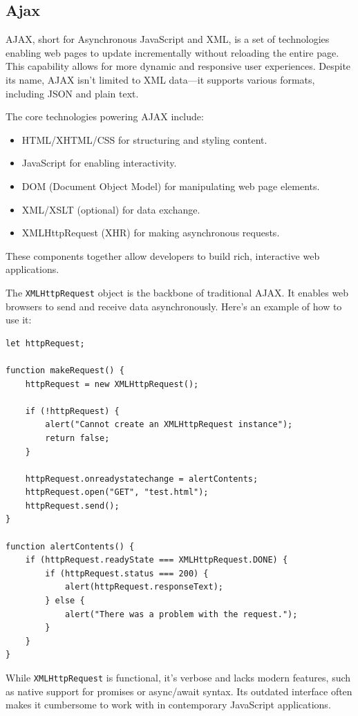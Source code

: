 \subsection*{Ajax}
AJAX, short for Asynchronous JavaScript and XML, is a set of technologies enabling web pages to update incrementally without reloading the entire page. This capability allows for more dynamic and responsive user experiences. Despite its name, AJAX isn’t limited to XML data—it supports various formats, including JSON and plain text.

The core technologies powering AJAX include:
\begin{itemize}
    \item HTML/XHTML/CSS for structuring and styling content.
    \item JavaScript for enabling interactivity.
    \item DOM (Document Object Model) for manipulating web page elements.
    \item XML/XSLT (optional) for data exchange.
    \item XMLHttpRequest (XHR) for making asynchronous requests.
\end{itemize}
These components together allow developers to build rich, interactive web applications.

The \texttt{XMLHttpRequest} object is the backbone of traditional AJAX. It enables web browsers to send and receive data asynchronously. Here’s an example of how to use it:

\begin{verbatim}
let httpRequest;

function makeRequest() {
    httpRequest = new XMLHttpRequest();

    if (!httpRequest) {
        alert("Cannot create an XMLHttpRequest instance");
        return false;
    }

    httpRequest.onreadystatechange = alertContents;
    httpRequest.open("GET", "test.html");
    httpRequest.send();
}

function alertContents() {
    if (httpRequest.readyState === XMLHttpRequest.DONE) {
        if (httpRequest.status === 200) {
            alert(httpRequest.responseText);
        } else {
            alert("There was a problem with the request.");
        }
    }
}
\end{verbatim}
While \texttt{XMLHttpRequest} is functional, it’s verbose and lacks modern features, such as native support for promises or async/await syntax. Its outdated interface often makes it cumbersome to work with in contemporary JavaScript applications.

